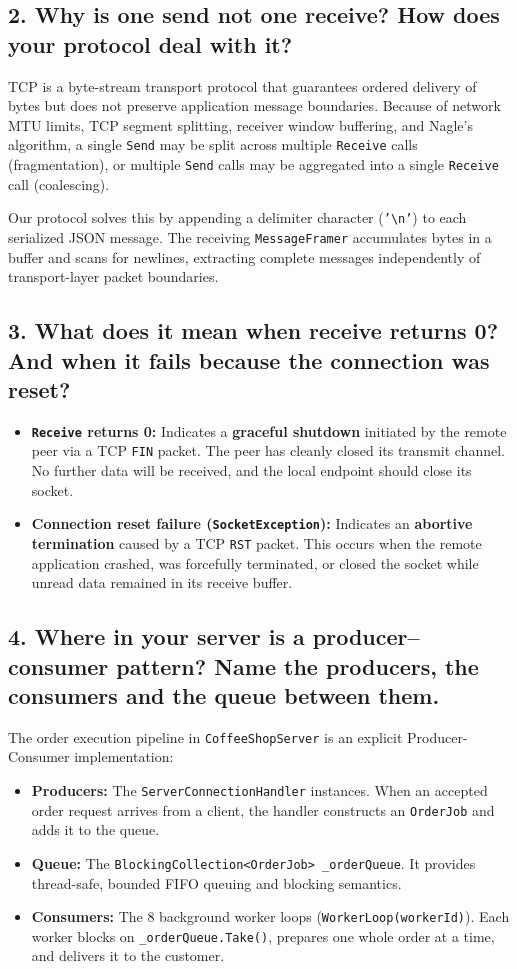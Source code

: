 \documentclass[12pt,a4paper]{article}
\begin{document}
\subsection{2. Why is one send not one receive? How does your protocol deal with it?}
TCP is a byte-stream transport protocol that guarantees ordered delivery of bytes but does not preserve application message boundaries. Because of network MTU limits, TCP segment splitting, receiver window buffering, and Nagle's algorithm, a single \texttt{Send} may be split across multiple \texttt{Receive} calls (fragmentation), or multiple \texttt{Send} calls may be aggregated into a single \texttt{Receive} call (coalescing).

Our protocol solves this by appending a delimiter character (\texttt{'\textbackslash n'}) to each serialized JSON message. The receiving \texttt{MessageFramer} accumulates bytes in a buffer and scans for newlines, extracting complete messages independently of transport-layer packet boundaries.

\subsection{3. What does it mean when receive returns 0? And when it fails because the connection was reset?}
\begin{itemize}
    \item \textbf{\texttt{Receive} returns 0:} Indicates a \textbf{graceful shutdown} initiated by the remote peer via a TCP \texttt{FIN} packet. The peer has cleanly closed its transmit channel. No further data will be received, and the local endpoint should close its socket.
    \item \textbf{Connection reset failure (\texttt{SocketException}):} Indicates an \textbf{abortive termination} caused by a TCP \texttt{RST} packet. This occurs when the remote application crashed, was forcefully terminated, or closed the socket while unread data remained in its receive buffer.
\end{itemize}

\subsection{4. Where in your server is a producer--consumer pattern? Name the producers, the consumers and the queue between them.}
The order execution pipeline in \texttt{CoffeeShopServer} is an explicit Producer-Consumer implementation:
\begin{itemize}
    \item \textbf{Producers:} The \texttt{ServerConnectionHandler} instances. When an accepted order request arrives from a client, the handler constructs an \texttt{OrderJob} and adds it to the queue.
    \item \textbf{Queue:} The \texttt{BlockingCollection<OrderJob> \_orderQueue}. It provides thread-safe, bounded FIFO queuing and blocking semantics.
    \item \textbf{Consumers:} The 8 background worker loops (\texttt{WorkerLoop(workerId)}). Each worker blocks on \texttt{\_orderQueue.Take()}, prepares one whole order at a time, and delivers it to the customer.
\end{itemize}
\end{document}
